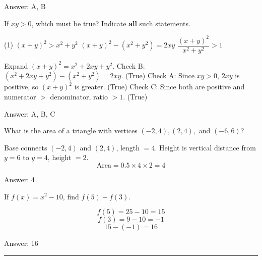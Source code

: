 \documentclass[11pt,paper=a4,answers]{exam}
\begin{document}
\begin{questions}
\begin{solution}
Answer: \colorbox{yellow!100}{A, B}
\end{solution}

\vspace{1cm}

\question
If $xy > 0$, which must be true?
Indicate \textbf{all} such statements.

\begin{tasks}(1)
\task[A)] $(x + y)^2 > x^2 + y^2$
\task[B)] $(x + y)^2 - (x^2 + y^2) = 2xy$
\task[C)] $\dfrac{(x + y)^2}{x^2 + y^2} > 1$
\end{tasks}

\begin{solution}
Expand $(x+y)^2 = x^2 + 2xy + y^2$.
\vspace{5pt}
Check B: $(x^2 + 2xy + y^2) - (x^2 + y^2) = 2xy$. (True)
\vspace{5pt}
Check A: Since $xy > 0$, $2xy$ is positive, so $(x+y)^2$ is greater. (True)
\vspace{5pt}
Check C: Since both are positive and numerator $>$ denominator, ratio $> 1$. (True)

Answer: \colorbox{yellow!100}{A, B, C}
\end{solution}

\vspace{1cm}


\question
What is the area of a triangle with vertices $(-2, 4), (2, 4),$ and $(-6, 6)$?

\begin{solution}
Base connects $(-2, 4)$ and $(2, 4)$, length $= 4$.
\vspace{5pt}
Height is vertical distance from $y=6$ to $y=4$, height $= 2$.
\vspace{5pt}
\[ \text{Area} = 0.5 \times 4 \times 2 = 4 \]

Answer: \colorbox{yellow!100}{4}
\end{solution}

\vspace{1cm}

\question
If $f(x) = x^2 - 10$, find $f(5) - f(3)$.

\begin{solution}
\[ f(5) = 25 - 10 = 15 \]
\vspace{5pt}
\[ f(3) = 9 - 10 = -1 \]
\vspace{5pt}
\[ 15 - (-1) = 16 \]

Answer: \colorbox{yellow!100}{16}
\end{solution}
\end{questions}

\begin{center}
\rule{.5\textwidth}{1pt}
\end{center}
\end{document}
